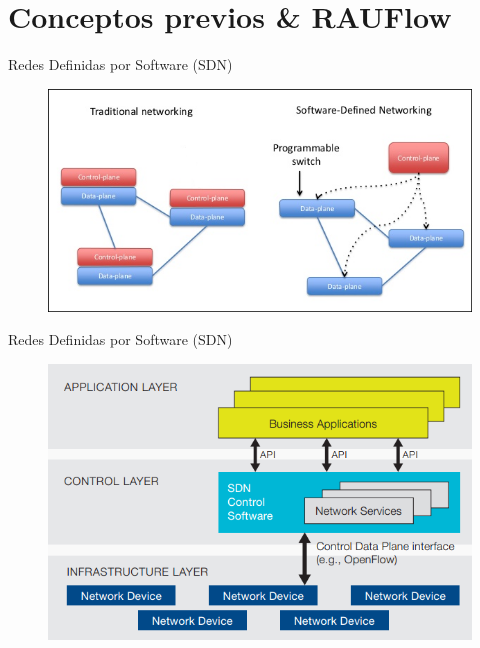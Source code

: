 \documentclass[xcolor=svgnames]{beamer}
\begin{document}
\section{Conceptos previos \& RAUFlow}

\begin{frame}{}
	\tableofcontents[currentsection]
\end{frame}

\begin{frame}{Redes Definidas por Software (SDN)}
	\begin{figure}[t]
		\includegraphics[scale=0.6]{sdn_transicion}
	\end{figure}
\end{frame}

\begin{frame}{Redes Definidas por Software (SDN)}
	\begin{figure}[t]
		\includegraphics[scale=0.6]{arquitectura_sdn}
	\end{figure}
\end{frame}
\end{document}
